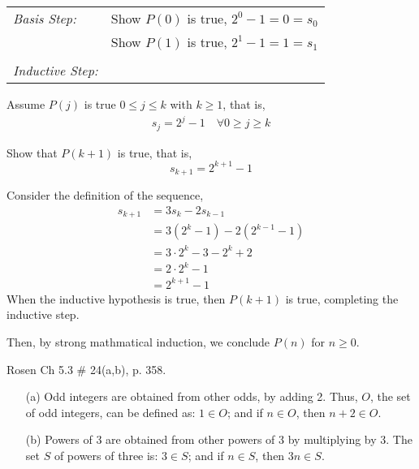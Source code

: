\begin{questions}
\begin{solution}
  \smallskip
  \begin{tabular}{lp{4in}}
    \textit{Basis Step:}  & Show $P(0)$ is true, $2^0 - 1 = 0 = s_0$ \\
                & Show $P(1)$ is true, $2^1 - 1 = 1 = s_1$ \\
     & \\
   \textit{Inductive Step:} &  \\
  \end{tabular}

  Assume $P(j)$ is true $0 \leq j \leq k$ with $k \geq 1$, that is, 
  \begin{align*}
    s_j = 2^j - 1 \quad \forall 0 \geq j \geq k \tag{IH}
  \end{align*}

  Show that $P(k+1)$ is true, that is,
  \[ s_{k+1} = 2^{k+1} - 1 \] 

  Consider the definition of the sequence, 
  \begin{align*}
    s_{k+1} &= 3s_{k} - 2s_{k-1} \\
    &= 3(2^k - 1) - 2(2^{k-1} - 1) \\
    &= 3\cdot 2^k - 3 - 2^k + 2 \\
    &= 2\cdot 2^k - 1 \\
    &= 2^{k+1} - 1
  \end{align*}
  When the inductive hypothesis is true, then $P(k+1)$ is true, completing the inductive step. 

  Then, by strong mathmatical induction, we conclude $P(n)$ for $n \geq 0$.
\end{solution}


 Rosen Ch 5.3 \# 24(a,b), p. 358.
    \ifprintanswers
        \vspace{-10pt}
   \fi
\begin{solution}
  \begin{itemize}
    \item[(a)] Odd integers are obtained from other odds, by adding 2. Thus, $O$, the set of odd integers, can be defined as:  $1 \in O$;  and if $n \in O$, then $n+2  \in O$.
    \item[(b)] Powers of 3 are obtained from other powers of 3 by multiplying by 3.  The set $S$ of powers of three is:  $3 \in S$; and if $n \in S$, then $3n \in S$.
  \end{itemize}
\end{solution}


\end{questions}
